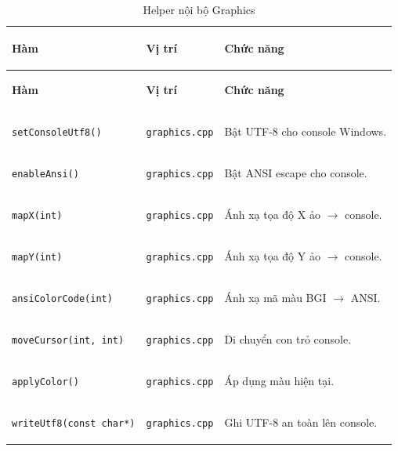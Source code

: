 \documentclass[14pt,a4paper]{report}
\begin{document}
\renewcommand{\arraystretch}{1.15}
\setlength{\tabcolsep}{6pt}

\begin{longtable}{|>{\bfseries\raggedright\arraybackslash}p{}|
                   >{\bfseries\raggedright\arraybackslash}p{2.8cm}|
                   >{\raggedright\arraybackslash}p{}|}
\caption{Helper nội bộ Graphics}\\
\hline
\rowcolor{headergray}
\color{white}\textbf{Hàm} & \color{white}\textbf{Vị trí} & \color{white}\textbf{Chức năng} \\
\hline
\endfirsthead

\hline
\rowcolor{headergray}
\color{white}\textbf{Hàm} & \color{white}\textbf{Vị trí} & \color{white}\textbf{Chức năng} \\
\hline
\endhead

\hline
\endfoot

\hline
\endlastfoot

\texttt{setConsoleUtf8()} & \texttt{graphics.cpp} & Bật UTF-8 cho console Windows.\\ \hline
\texttt{enableAnsi()} & \texttt{graphics.cpp} & Bật ANSI escape cho console.\\ \hline
\texttt{mapX(int)} & \texttt{graphics.cpp} & Ánh xạ tọa độ X ảo $\rightarrow$ console.\\ \hline
\texttt{mapY(int)} & \texttt{graphics.cpp} & Ánh xạ tọa độ Y ảo $\rightarrow$ console.\\ \hline
\texttt{ansiColorCode(int)} & \texttt{graphics.cpp} & Ánh xạ mã màu BGI $\rightarrow$ ANSI.\\ \hline
\texttt{moveCursor(int, int)} & \texttt{graphics.cpp} & Di chuyển con trỏ console.\\ \hline
\texttt{applyColor()} & \texttt{graphics.cpp} & Áp dụng màu hiện tại.\\ \hline
\texttt{writeUtf8(const char*)} & \texttt{graphics.cpp} & Ghi UTF-8 an toàn lên console.\\ \hline

\end{longtable}

\renewcommand{\arraystretch}{1.15}
\setlength{\tabcolsep}{6pt}
\end{document}
